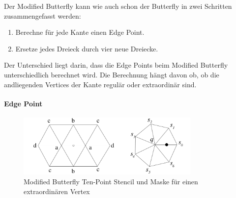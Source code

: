 Der Modified Butterfly kann wie auch schon der Butterfly in zwei Schritten zusammengefasst werden:
\begin{enumerate}
\item Berechne für jede Kante einen Edge Point.
\item Ersetze jedes Dreieck durch vier neue Dreiecke.
\end{enumerate}
Der Unterschied liegt darin, dass die Edge Points beim Modified Butterfly
unterschiedlich berechnet wird. Die Berechnung hängt davon ob,
ob die andliegenden Vertices der Kante regulär oder extraordinär sind.

\paragraph*{Edge Point}

\begin{figure}
\centering
\includegraphics[width=0.8\textwidth]{content/media/sd_modbutterfly_mask.jpg}
\caption{Modified Butterfly Ten-Point Stencil und Maske für einen extraordinären Vertex
\cite{Zorin:1996:ISM:237170.237254}}
\label{fig:sd_modbutterfly_mask}
\end{figure}

